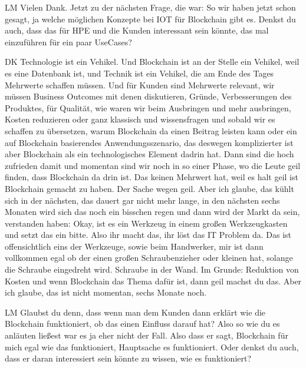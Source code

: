 \begin{xlist}
     \item[LM] Vielen Dank. Jetzt zu der nächsten Frage, die war: So wir haben jetzt schon gesagt, ja welche möglichen Konzepte bei IOT für Blockchain gibt es. Denkst du auch, dass das für HPE und die Kunden interessant sein könnte, das mal einzuführen für ein paar UseCases?
     \item[DK] Technologie ist ein Vehikel. Und Blockchain ist an der Stelle ein Vehikel, weil es eine Datenbank ist, und Technik ist ein Vehikel, die am Ende des Tages Mehrwerte schaffen müssen.  Und für Kunden sind Mehrwerte relevant, wir müssen Business Outcomes mit denen diskutieren, Gründe, Verbesserungen des Produktes, für Qualität, wie waren wir beim Ausbringen und mehr ausbringen, Kosten reduzieren oder ganz klassisch und wissensfragen und sobald wir es schaffen zu übersetzen, warum Blockchain da einen Beitrag leisten kann oder ein auf Blockchain basierendes Anwendungsszenario, das deswegen komplizierter ist aber Blockchain als ein technologisches Element dadrin hat. Dann sind die hoch zufrieden damit und momentan sind wir noch in so einer Phase, wo die Leute geil finden, dass Blockchain da drin ist. Das keinen Mehrwert hat, weil es halt geil ist Blockchain gemacht zu haben. Der Sache wegen geil. Aber ich glaube, das kühlt sich in der nächsten, das dauert gar nicht mehr lange, in den nächsten sechs Monaten wird sich das noch ein bisschen regen und dann wird der Markt da sein, verstanden haben: Okay, ist es ein Werkzeug in einem großen Werkzeugkasten und setzt das ein bitte. Also ihr macht das, ihr löst das IT Problem da. Das ist offensichtlich eins der Werkzeuge, sowie beim Handwerker, mir ist dann vollkommen egal ob der einen großen Schraubenzieher oder kleinen hat, solange die Schraube eingedreht wird. Schraube in der Wand. Im Grunde: Reduktion von Kosten und wenn Blockchain das Thema dafür ist, dann geil machst du das. Aber ich glaube, das ist nicht momentan, sechs Monate noch.
     \item[LM] Glaubst du denn, dass wenn man dem Kunden dann erklärt wie die Blockchain funktioniert, ob das einen Einfluss darauf hat? Also so wie du es anläuten ließest war es ja eher nicht der Fall. Also dass er sagt, Blockchain für mich egal wie das funktioniert, Hauptsache es funktioniert. Oder denkst du auch, dass er daran interessiert sein könnte zu wissen, wie es funktioniert? 

\end{xlist}
